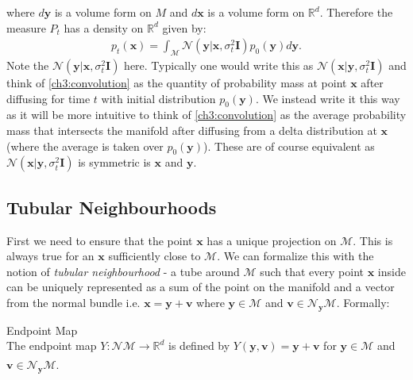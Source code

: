 where $d\textbf{y}$ is a volume form on $M$ and $d\textbf{x}$ is a volume form on $\mathbb{R}^d$.
Therefore the measure $P_t$ has a density on $\mathbb{R}^d$ given by:
\begin{gather}
    \label{ch3:convolution}
    p_t(\textbf{x}) = \int_\mathcal{M} \mathcal{N}(\textbf{y} | \textbf{x}, \sigma^2_t\textbf{I}) p_0(\textbf{y}) d\textbf{y}.
\end{gather}
Note the $\mathcal{N}(\textbf{y}|\textbf{x},\sigma^2_t\textbf{I})$ here. Typically one would write this as $\mathcal{N}(\textbf{x}|\textbf{y},\sigma^2_t\textbf{I})$ and think of \eqref{ch3:convolution} as the quantity of probability mass at point $\textbf{x}$ after diffusing for time $t$ with initial distribution $p_0(\textbf{y})$. We instead write it this way as it will be more intuitive to think of \eqref{ch3:convolution} as the average probability mass that intersects the manifold after diffusing from a delta distribution at $\textbf{x}$ (where the average is taken over $p_0(\textbf{y})$). These are of course equivalent as $\mathcal{N}(\textbf{x}|\textbf{y},\sigma^2_t\textbf{I})$ is symmetric is $\textbf{x}$ and $\textbf{y}$.

\subsection*{Tubular Neighbourhoods}
First we need to ensure that the point $\textbf{x}$ has a unique projection on $\mathcal{M}$. This is always true for an $\textbf{x}$ sufficiently close to $\mathcal{M}$. We can formalize this with the notion of \textit{tubular neighbourhood} - a tube around $\mathcal{M}$ such that every point $\textbf{x}$ inside can be uniquely represented as a sum of the point on the manifold and a vector from the normal bundle i.e. $\textbf{x} = \textbf{y} + \textbf{v}$ where $\textbf{y} \in \mathcal{M}$ and $\textbf{v} \in \mathcal{N}_\textbf{y} \mathcal{M}$. Formally:

\begin{definition}
Endpoint Map\\
The endpoint map $Y: \mathcal{NM} \xrightarrow[]{} \mathbb{R}^d$ is defined by $Y(\textbf{y}, \textbf{v}) = \textbf{y} + \textbf{v}$ for $\textbf{y} \in \mathcal{M}$ and $\textbf{v} \in \mathcal{N}_\textbf{y} \mathcal{M}$. 
\end{definition}

